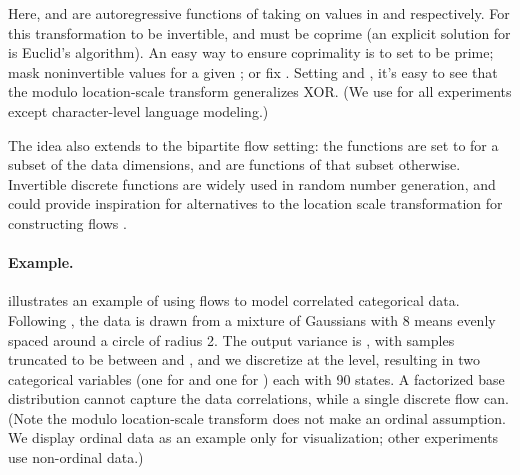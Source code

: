 \documentclass{article}
\begin{document}
Here,  and  are autoregressive functions of  taking on values in  and  respectively. For this transformation to be invertible,  and  must be coprime (an explicit solution for  is Euclid's algorithm). An easy way to ensure coprimality is to set  to be prime; mask noninvertible  values for a given ; or fix . Setting  and , it's easy to see that the modulo location-scale transform generalizes XOR. (We use  for all experiments except character-level language modeling.)

The idea also extends to the bipartite flow setting: the functions  are set to  for a subset of the data dimensions, and are functions of that subset otherwise. Invertible discrete functions are widely used in random number generation, and could provide inspiration for alternatives to the location scale transformation for constructing flows \citep{salmon2011parallel}.



\paragraph{Example.}
 illustrates an example of using flows to model correlated categorical data. Following \citet{metz2016unrolled}, the data is drawn from a mixture of Gaussians with 8 means evenly spaced around a circle of radius 2. The output variance is , with samples truncated to be between  and , and we discretize at the  level, resulting in two categorical variables (one for  and one for ) each with 90 states. A factorized base distribution cannot capture the data correlations, while a single discrete flow can. (Note the modulo location-scale transform does not make an ordinal assumption. We display ordinal data as an example only for visualization; other experiments use non-ordinal data.)
\end{document}
